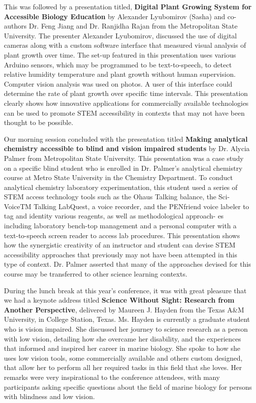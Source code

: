 \documentclass[11.5pt]{sig-alternate}
\begin{document}
\begin{large}
This was followed by a presentation titled, \textbf{Digital Plant Growing System for Accessible Biology Education} by Alexander Lyubomirov (Sasha) and co-authors Dr. Feng Jiang and Dr. Ranjidha Rajan from the Metropolitan State University. The presenter Alexander Lyubomirov, discussed the use of digital cameras along with a custom software interface that measured visual analysis of plant growth over time. The set-up featured in this presentation uses various Arduino sensors, which may be programmed to be text-to-speech, to detect relative humidity temperature and plant growth without human supervision. Computer vision analysis was used on photos. A user of this interface could determine the rate of plant growth over specific time intervals. This presentation clearly shows how innovative applications for commercially available technologies can be used to promote STEM accessibility in contexts that may not have been thought to be possible.

Our morning session concluded with the presentation titled \textbf{Making analytical chemistry accessible to blind and vision impaired students} by Dr. Alycia Palmer from Metropolitan State University. This presentation was a case study on a specific blind student who is enrolled in Dr. Palmer’s analytical chemistry course at Metro State University in the Chemistry Department. To conduct analytical chemistry laboratory experimentation, this student used a series of STEM access technology tools such as the Ohaus Talking balance, the Sci-VoiceTM Talking LabQuest, a voice recorder, and the PENfriend voice labeler to tag and identity various reagents, as well as methodological approach- es including laboratory bench-top management and a personal computer with a text-to-speech screen reader to access lab procedures. This presentation shows how the synergistic creativity of an instructor and student can devise STEM accessibility approaches that previously may not have been attempted in this type of context. Dr. Palmer asserted that many of the approaches devised for this course may be transferred to other science learning contexts.

During the lunch break at this year’s conference, it was with great pleasure that we had a keynote address titled \textbf{Science Without Sight: Research from Another Perspective}, delivered by Maureen J. Hayden from the Texas A\&M University, in College Station, Texas. Ms. Hayden is currently a graduate student who is vision impaired. She discussed her journey to science research as a person with low vision, detailing how she overcame her disability, and the experiences that informed and inspired her career in marine biology. She spoke to how she uses low vision tools, some commercially available and others custom designed, that allow her to perform all her required tasks in this field that she loves. Her remarks were very inspirational to the conference attendees, with many participants asking specific questions about the field of marine biology for persons with blindness and low vision.


\end{large}
\end{document}

